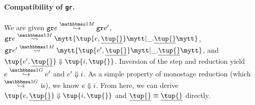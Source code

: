 \begin{abstrsyn}
\paragraph{Compatibility of {\tt gr}.}
We are given 
$\stepmix {\pure e} {\pure {e'}}$, \\
$\splitone {\pure e} A {\tup {e,\exv {\tup{}}}} {\_.\exv{\tup{}}}$, 
$\splitone {\pure {e'}} A {\tup {e',\exv {\tup{}}}} {\_.\exv{\tup{}}}$,
and $\reduce {\tup {e',\exv {\tup{}}}} {\tup{i,\tup{}}}$.
Inversion of the step and reduction yield \mbox{$\steppure e {e'}$} and ${e'} \Downarrow {i}$.
As a simple property of monostage reduction (which $\stepsym \bbonep$ is), we know ${e} \Downarrow {i}$.
From here, we can derive $\reduce {\tup {e,\exv {\tup{}}}} {\tup{i,\tup{}}}$ and $\exv{\tup {}} \equiv \exv{\tup {}}$ directly.








\end{abstrsyn}
